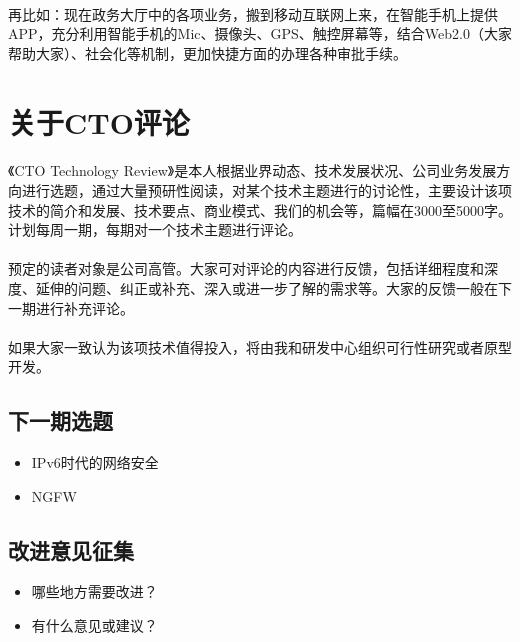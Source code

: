 \documentclass[a4paper,14pt,openany]{article}
\begin{document}
\paragraph{}再比如：现在政务大厅中的各项业务，搬到移动互联网上来，在智能手机上提供APP，充分利用智能手机的Mic、摄像头、GPS、触控屏幕等，结合Web2.0（大家帮助大家）、社会化等机制，更加快捷方面的办理各种审批手续。
\newpage
\section{关于CTO评论}
\paragraph{}
《CTO Technology Review》是本人根据业界动态、技术发展状况、公司业务发展方向进行选题，通过大量预研性阅读，对某个技术主题进行的讨论性，主要设计该项技术的简介和发展、技术要点、商业模式、我们的机会等，篇幅在3000至5000字。计划每周一期，每期对一个技术主题进行评论。
\paragraph{}
预定的读者对象是公司高管。大家可对评论的内容进行反馈，包括详细程度和深度、延伸的问题、纠正或补充、深入或进一步了解的需求等。大家的反馈一般在下一期进行补充评论。
\paragraph{}
如果大家一致认为该项技术值得投入，将由我和研发中心组织可行性研究或者原型开发。
\subsection{下一期选题}
\begin{itemize}
\item
IPv6时代的网络安全
\item
NGFW 
\end{itemize}
\subsection{改进意见征集}
\begin{itemize}
\item
哪些地方需要改进？
\item
有什么意见或建议？
\end{itemize}
\end{document}
